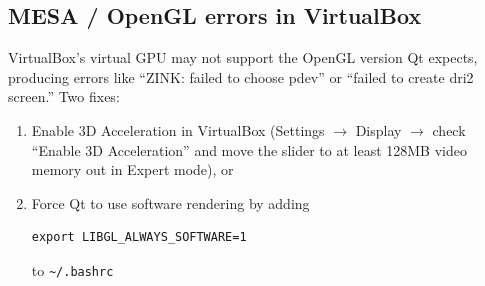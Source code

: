 \documentclass[11pt]{article}
\begin{document}
\subsection{MESA / OpenGL errors in VirtualBox}

VirtualBox's virtual GPU may not support the OpenGL version Qt expects,
producing errors like ``ZINK: failed to choose pdev'' or ``failed to
create dri2 screen.''  Two fixes:

\begin{enumerate}[nosep]
\item Enable 3D Acceleration in VirtualBox (Settings $\rightarrow$
      Display $\rightarrow$ check ``Enable 3D Acceleration'' and move the slider to at least 128MB video memory out in Expert mode), or
\item Force Qt to use software rendering by adding
\begin{lstlisting}
export LIBGL_ALWAYS_SOFTWARE=1
\end{lstlisting}
to \verb+~/.bashrc+
\end{enumerate}
\end{document}
